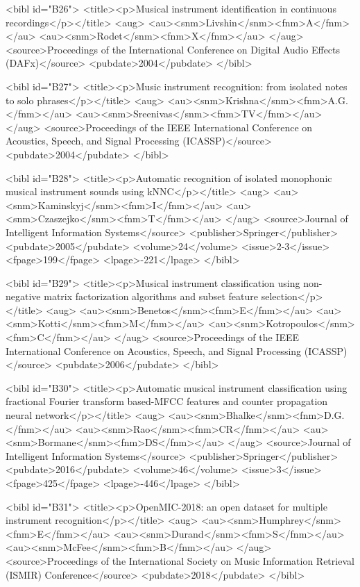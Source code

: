 \documentclass{bmcart}
\begin{document}
\begin{backmatter}
{<bibl id="B26">
  <title><p>Musical instrument identification in continuous
  recordings</p></title>
  <aug>
    <au><snm>Livshin</snm><fnm>A</fnm></au>
    <au><snm>Rodet</snm><fnm>X</fnm></au>
  </aug>
  <source>Proceedings of the International Conference on Digital Audio Effects
  (DAFx)</source>
  <pubdate>2004</pubdate>
</bibl>

<bibl id="B27">
  <title><p>Music instrument recognition: from isolated notes to solo
  phrases</p></title>
  <aug>
    <au><snm>Krishna</snm><fnm>A.G.</fnm></au>
    <au><snm>Sreenivas</snm><fnm>TV</fnm></au>
  </aug>
  <source>Proceedings of the IEEE International Conference on Acoustics,
  Speech, and Signal Processing (ICASSP)</source>
  <pubdate>2004</pubdate>
</bibl>

<bibl id="B28">
  <title><p>{Automatic recognition of isolated monophonic musical instrument
  sounds using kNNC}</p></title>
  <aug>
    <au><snm>Kaminskyj</snm><fnm>I</fnm></au>
    <au><snm>Czaszejko</snm><fnm>T</fnm></au>
  </aug>
  <source>Journal of Intelligent Information Systems</source>
  <publisher>Springer</publisher>
  <pubdate>2005</pubdate>
  <volume>24</volume>
  <issue>2-3</issue>
  <fpage>199</fpage>
  <lpage>-221</lpage>
</bibl>

<bibl id="B29">
  <title><p>Musical instrument classification using non-negative matrix
  factorization algorithms and subset feature selection</p></title>
  <aug>
    <au><snm>Benetos</snm><fnm>E</fnm></au>
    <au><snm>Kotti</snm><fnm>M</fnm></au>
    <au><snm>Kotropoulos</snm><fnm>C</fnm></au>
  </aug>
  <source>Proceedings of the IEEE International Conference on Acoustics,
  Speech, and Signal Processing (ICASSP)</source>
  <pubdate>2006</pubdate>
</bibl>

<bibl id="B30">
  <title><p>{Automatic musical instrument classification using fractional
  Fourier transform based-MFCC features and counter propagation neural
  network}</p></title>
  <aug>
    <au><snm>Bhalke</snm><fnm>D.G.</fnm></au>
    <au><snm>Rao</snm><fnm>CR</fnm></au>
    <au><snm>Bormane</snm><fnm>DS</fnm></au>
  </aug>
  <source>Journal of Intelligent Information Systems</source>
  <publisher>Springer</publisher>
  <pubdate>2016</pubdate>
  <volume>46</volume>
  <issue>3</issue>
  <fpage>425</fpage>
  <lpage>-446</lpage>
</bibl>

<bibl id="B31">
  <title><p>OpenMIC-2018: an open dataset for multiple instrument
  recognition</p></title>
  <aug>
    <au><snm>Humphrey</snm><fnm>E</fnm></au>
    <au><snm>Durand</snm><fnm>S</fnm></au>
    <au><snm>McFee</snm><fnm>B</fnm></au>
  </aug>
  <source>Proceedings of the International Society on Music Information
  Retrieval (ISMIR) Conference</source>
  <pubdate>2018</pubdate>
</bibl>

}
\end{backmatter}
\end{document}
